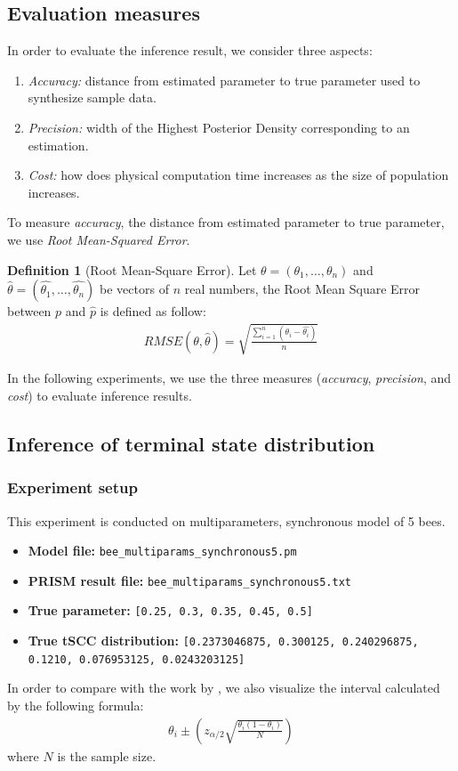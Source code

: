 \documentclass[12pt]{article}
\theoremstyle{definition}
\newtheorem{definition}{Definition}[section]
\begin{document}
\subsection{Evaluation measures}
In order to evaluate the inference result, we consider three aspects:
\begin{enumerate}
\item \textit{Accuracy:} distance from estimated parameter to true parameter
  used to synthesize sample data.
\item \textit{Precision:} width of the Highest Posterior Density corresponding
  to an estimation.
\item \textit{Cost:} how does physical computation time increases as the size of
  population increases.
\end{enumerate}

To measure \textit{accuracy}, the distance from estimated parameter to true parameter, we use \textit{Root
Mean-Squared Error}.
\begin{definition}[Root Mean-Square Error]
  Let $\theta = (\theta_1,\ldots,\theta_n)$ and $\hat{\theta} =
  (\hat{\theta_1},\ldots,\hat{\theta_n})$ be vectors of $n$ real numbers, the
  Root Mean Square Error between $p$ and $\hat{p}$ is defined as follow:
  \begin{align*}
    RMSE(\theta, \hat{\theta}) = \sqrt{\frac{\sum_{i=1}^n{(\theta_i - \hat{\theta_i})}}{n}}
  \end{align*}

In the following experiments, we use the three measures (\textit{accuracy},
\textit{precision}, and \textit{cost}) to evaluate inference results.
\end{definition}

\subsection{Inference of terminal state distribution}
\subsubsection{Experiment setup}
This experiment is conducted on multiparameters, synchronous model of 5 bees.

\begin{itemize}
\item \textbf{Model file:} \texttt{bee\_multiparams\_synchronous5.pm}
\item \textbf{PRISM result file:} \texttt{bee\_multiparams\_synchronous5.txt}
\item \textbf{True parameter:} \texttt{[0.25, 0.3, 0.35, 0.45, 0.5]}
\item \textbf{True tSCC distribution:} \texttt{[0.2373046875, 0.300125, 0.240296875, 0.1210, 0.076953125, 0.0243203125]}
\end{itemize}
In order to compare with the work by \cite{hajnal2019data}, we also visualize
the interval calculated by the following formula:
\begin{align*}
  \theta_i \pm (z_{\alpha / 2}\sqrt{\frac{\theta_i(1-\theta_i)}{N}})
\end{align*}
where $N$ is the sample size.
 
\end{document}
